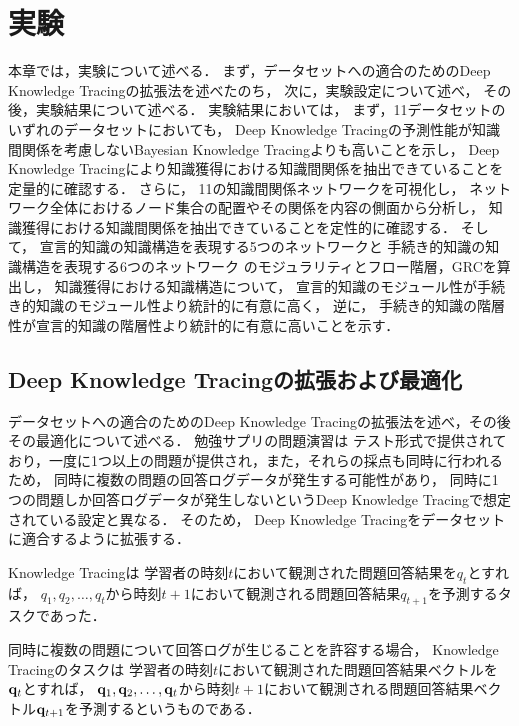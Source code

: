 \chapter{実験}
\label{chap:result}
\fancyhf{}
\rhead{\thepage}
\cfoot{\thepage}


本章では，実験について述べる．
まず，データセットへの適合のためのDeep Knowledge Tracingの拡張法を述べたのち，
次に，実験設定について述べ，
その後，実験結果について述べる．
実験結果においては，
まず，11データセットのいずれのデータセットにおいても，
Deep Knowledge Tracingの予測性能が知識間関係を考慮しないBayesian Knowledge Tracingよりも高いことを示し，
Deep Knowledge Tracingにより知識獲得における知識間関係を抽出できていることを定量的に確認する．
さらに，
11の知識間関係ネットワークを可視化し，
ネットワーク全体におけるノード集合の配置やその関係を内容の側面から分析し，
知識獲得における知識間関係を抽出できていることを定性的に確認する．
そして，
宣言的知識の知識構造を表現する5つのネットワークと
手続き的知識の知識構造を表現する6つのネットワーク
のモジュラリティとフロー階層，GRCを算出し，
知識獲得における知識構造について，
宣言的知識のモジュール性が手続き的知識のモジュール性より統計的に有意に高く，
逆に，
手続き的知識の階層性が宣言的知識の階層性より統計的に有意に高いことを示す．


\section{Deep Knowledge Tracingの拡張および最適化}
データセットへの適合のためのDeep Knowledge Tracingの拡張法を述べ，その後その最適化について述べる．
勉強サプリの問題演習は
テスト形式で提供されており，一度に1つ以上の問題が提供され，また，それらの採点も同時に行われるため，
同時に複数の問題の回答ログデータが発生する可能性があり，
同時に1つの問題しか回答ログデータが発生しないというDeep Knowledge Tracingで想定されている設定と異なる．
そのため，
Deep Knowledge Tracingをデータセットに適合するように拡張する．


Knowledge Tracingは
学習者の時刻$t$において観測された問題回答結果を$q_{t}$とすれば，
$q_1, q_2, \dots, q_t$から時刻$t+1$において観測される問題回答結果$q_{t+1}$を予測するタスクであった．

同時に複数の問題について回答ログが生じることを許容する場合， 
Knowledge Tracingのタスクは
学習者の時刻$t$において観測された問題回答結果ベクトルを${\bf q}_{t}$とすれば，
${\bf q}_1, {\bf q}_2, \dots, {\bf q}_t$から時刻$t+1$において観測される問題回答結果ベクトル${\bf q}_{t+1}$を予測するというものである．

